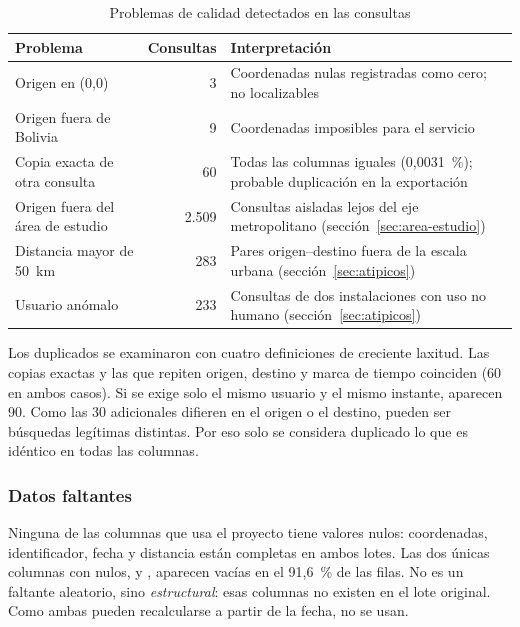\begin{table}[H]
  \centering
  \caption{Problemas de calidad detectados en las consultas}
  \label{tab:calidad-consultas}
  \interlineadoSimple
  \small
  \begin{tabularx}{\textwidth}{@{}L{0.30\textwidth}rY@{}}
    \toprule
    \textbf{Problema} & \textbf{Consultas} & \textbf{Interpretación} \\
    \midrule
    Origen en (0,0) & 3 & Coordenadas nulas registradas como cero; no localizables \\
    Origen fuera de Bolivia & 9 & Coordenadas imposibles para el servicio \\
    Copia exacta de otra consulta & 60 & Todas las columnas iguales (0,0031~\%); probable duplicación en la exportación \\
    Origen fuera del área de estudio & 2.509 & Consultas aisladas lejos del eje metropolitano (sección~\ref{sec:area-estudio}) \\
    Distancia mayor de 50~km & 283 & Pares origen--destino fuera de la escala urbana (sección~\ref{sec:atipicos}) \\
    Usuario anómalo & 233 & Consultas de dos instalaciones con uso no humano (sección~\ref{sec:atipicos}) \\
    \bottomrule
  \end{tabularx}
\end{table}

Los duplicados se examinaron con cuatro definiciones de creciente laxitud. Las copias
exactas y las que repiten origen, destino y marca de tiempo coinciden (60 en ambos casos).
Si se exige solo el mismo usuario y el mismo instante, aparecen 90. Como las 30 adicionales
difieren en el origen o el destino, pueden ser búsquedas legítimas distintas. Por eso solo
se considera duplicado lo que es idéntico en todas las columnas.

\subsubsection{Datos faltantes}
\label{sec:datos-faltantes-eda}

Ninguna de las columnas que usa el proyecto tiene valores nulos: coordenadas,
identificador, fecha y distancia están completas en ambos lotes. Las dos únicas columnas
con nulos,  y , aparecen vacías en el 91,6~\% de
las filas. No es un faltante aleatorio, sino \emph{estructural}: esas columnas no existen en
el lote original. Como ambas pueden recalcularse a partir de la fecha, no se usan.

